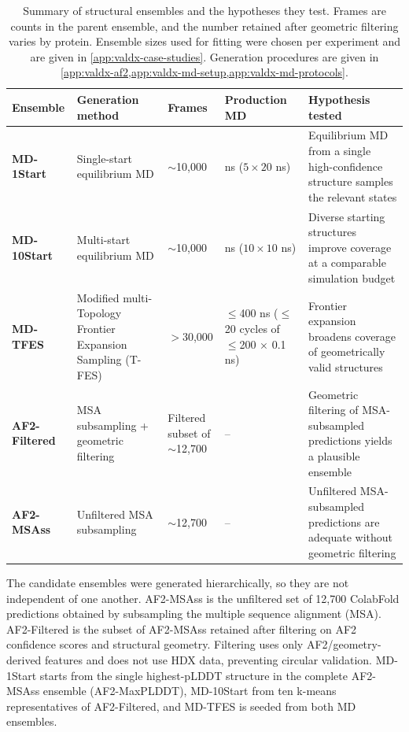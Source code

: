 \begin{table}[htbp]
    \centering
    \small
    \begin{tabularx}{\textwidth}{@{}>{\raggedright\arraybackslash}p{1.8cm}>{\raggedright\arraybackslash}p{2.6cm}>{\raggedright\arraybackslash}p{1.8cm}>{\raggedright\arraybackslash}p{2.2cm}>{\raggedright\arraybackslash}X@{}}
    \toprule
        \textbf{Ensemble} & \textbf{Generation method} & \textbf{Frames} & \textbf{Production MD} & \textbf{Hypothesis tested} \\
        \midrule
        \textbf{MD-1Start} & Single-start equilibrium MD & $\sim$10,000 & 100 ns ($5\times20$ ns) & Equilibrium MD from a single high-confidence structure samples the relevant states \\
        \textbf{MD-10Start} & Multi-start equilibrium MD & $\sim$10,000 & 100 ns ($10\times10$ ns) & Diverse starting structures improve coverage at a comparable simulation budget \\
        \textbf{MD-TFES} & Modified multi-Topology Frontier Expansion Sampling (T-FES) & $>$30,000 & $\leq$400 ns ($\leq$20 cycles of $\leq$200 $\times$ 0.1 ns) & Frontier expansion broadens coverage of geometrically valid structures \\
        \textbf{AF2-Filtered} & MSA subsampling + geometric filtering & Filtered subset of $\sim$12,700 & -- & Geometric filtering of MSA-subsampled predictions yields a plausible ensemble \\
        \textbf{AF2-MSAss} & Unfiltered MSA subsampling & $\sim$12,700 & -- & Unfiltered MSA-subsampled predictions are adequate without geometric filtering \\
        \bottomrule
    \end{tabularx}
    \caption{Summary of structural ensembles and the hypotheses they test. Frames are counts in the parent ensemble, and the number retained after geometric filtering varies by protein. Ensemble sizes used for fitting were chosen per experiment and are given in \cref{app:valdx-case-studies}. Generation procedures are given in \cref{app:valdx-af2,app:valdx-md-setup,app:valdx-md-protocols}.}
    \label{tab:valdx-ensembles}
\end{table}

The candidate ensembles were generated hierarchically, so they are not independent of one another. AF2-MSAss is the unfiltered set of 12,700 ColabFold predictions obtained by subsampling the multiple sequence alignment (MSA).\supercite{mirditaColabFoldMakingProtein2022,monteirodasilvaHighthroughputPredictionProtein2024} AF2-Filtered is the subset of AF2-MSAss retained after filtering on AF2 confidence scores and structural geometry. Filtering uses only AF2/geometry-derived features and does not use HDX data, preventing circular validation. MD-1Start starts from the single highest-pLDDT structure in the complete AF2-MSAss ensemble (AF2-MaxPLDDT), MD-10Start from ten k-means representatives of AF2-Filtered, and MD-TFES is seeded from both MD ensembles.

